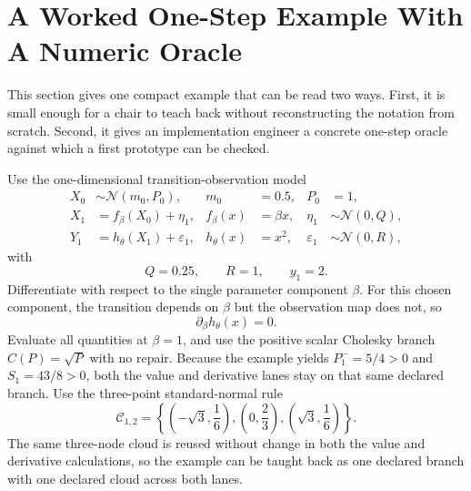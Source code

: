 \documentclass[11pt]{article}
\numberwithin{equation}{section}
\newcommand{\N}{\mathcal N}
\begin{document}
\section{A Worked One-Step Example With A Numeric Oracle}
\label{sec:p32-worked-example}

This section gives one compact example that can be read two ways.  First, it is
small enough for a chair to teach back without reconstructing the notation from
scratch.  Second, it gives an implementation engineer a concrete one-step oracle
against which a first prototype can be checked.

Use the one-dimensional transition-observation model
\begin{align}
  X_0 &\sim \N(m_0,P_0),
  &m_0&=0.5,
  &P_0&=1,
  \label{eq:p32-example-initial}\\
  X_1 &= f_\beta(X_0)+\eta_1,
  &f_\beta(x)&=\beta x,
  &\eta_1&\sim \N(0,Q),
  \label{eq:p32-example-transition}\\
  Y_1 &= h_\theta(X_1)+\varepsilon_1,
  &h_\theta(x)&=x^2,
  &\varepsilon_1&\sim \N(0,R),
  \label{eq:p32-example-observation}
\end{align}
with
\begin{equation}
  Q=0.25,
  \qquad
  R=1,
  \qquad
  y_1=2.
  \label{eq:p32-example-QRy}
\end{equation}
Differentiate with respect to the single parameter component \(\beta\).  For
this chosen component, the transition depends on \(\beta\) but the observation
map does not, so
\begin{equation}
  \partial_\beta h_\theta(x)=0.
  \label{eq:p32-example-hbeta-zero}
\end{equation}
Evaluate all quantities at \(\beta=1\), and use the positive scalar Cholesky
branch \(C(P)=\sqrt P\) with no repair.  Because the example yields
\(P_1^-=5/4>0\) and \(S_1=43/8>0\), both the value and derivative lanes stay on
that same declared branch.  Use the three-point standard-normal rule
\begin{equation}
  \mathcal C_{1,2}
  =
  \left\{
  \left(-\sqrt3,\frac16\right),
  \left(0,\frac23\right),
  \left(\sqrt3,\frac16\right)
  \right\}.
  \label{eq:p32-example-cloud}
\end{equation}
The same three-node cloud is reused without change in both the value and
derivative calculations, so the example can be taught back as one declared branch with one declared cloud across both lanes.
\end{document}
